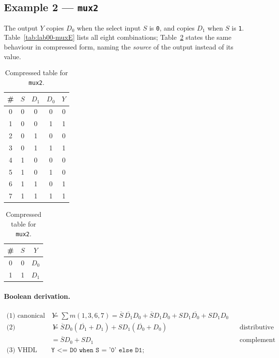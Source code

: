 \subsection{Example 2 --- \texttt{mux2}}

The output $Y$ copies $D_0$ when the select input $S$ is \texttt{0}, and copies
$D_1$ when $S$ is \texttt{1}. Table~\ref{tab:lab00-muxE} lists all eight
combinations; Table~\ref{tab:lab00-muxC} states the same behaviour in compressed
form, naming the \emph{source} of the output instead of its value.

\begin{table}[H]
\centering
\begin{minipage}{0.52\linewidth}
\centering
\caption{Exhaustive table for \texttt{mux2}.}
\label{tab:lab00-muxE}
\begin{tabular}{c|ccc|c}
\toprule
\# & $S$ & $D_1$ & $D_0$ & $Y$ \\
\midrule
0 & 0 & 0 & 0 & 0 \\
1 & 0 & 0 & 1 & 1 \\
2 & 0 & 1 & 0 & 0 \\
3 & 0 & 1 & 1 & 1 \\
4 & 1 & 0 & 0 & 0 \\
5 & 1 & 0 & 1 & 0 \\
6 & 1 & 1 & 0 & 1 \\
7 & 1 & 1 & 1 & 1 \\
\bottomrule
\end{tabular}
\end{minipage}%
\begin{minipage}{0.44\linewidth}
\centering
\caption{Compressed table for \texttt{mux2}.}
\label{tab:lab00-muxC}
\begin{tabular}{c|c|c}
\toprule
\# & $S$ & $Y$ \\
\midrule
0 & 0 & $D_0$ \\
1 & 1 & $D_1$ \\
\bottomrule
\end{tabular}
\end{minipage}
\end{table}

\paragraph{Boolean derivation.}
\begin{align*}
\text{(1) canonical} \quad
  Y &= \textstyle\sum m(1,3,6,7)
     = \overline{S}\,\overline{D_1}D_0 + \overline{S}D_1D_0 + SD_1\overline{D_0} + SD_1D_0 \\[4pt]
\text{(2) simplified} \quad
  Y &= \overline{S}D_0(\overline{D_1} + D_1) + SD_1(\overline{D_0} + D_0)
     && \text{distributive law} \\
  &= \overline{S}D_0 + SD_1
     && \text{complement law} \\[4pt]
\text{(3) VHDL} \quad
  & \texttt{Y <= D0 when S = '0' else D1;}
\end{align*}

